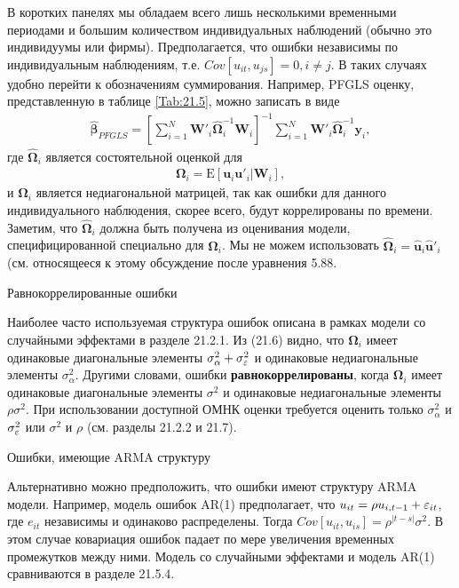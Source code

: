 В коротких панелях мы обладаем всего лишь несколькими временными периодами и большим количеством индивидуальных наблюдений (обычно это индивидуумы или фирмы). Предполагается, что ошибки независимы по индивидуальным наблюдениям, т.е. $Cov[u_{it}, u_{js}]=0, i \neq j$. В таких случаях удобно перейти к обозначениям суммирования. Например, PFGLS оценку, представленную в таблице \ref{Tab:21.5}, можно записать в виде
\begin{align}
\hat{\bm\beta}_{PFGLS}=\left[\sum^N_{i=1} \mathbf W'_i \hat{\bm\Omega}^{-1}_i \mathbf W_i \right]^{-1} \sum^N_{i=1} \mathbf W'_i \hat{\bm\Omega}^{-1}_i \mathbf y_i,
\label{Eq:21.20}
\end{align}
где $\hat{\bm\Omega}_i$ является состоятельной оценкой для 
\begin{align}
\bm\Omega_i =\mathrm E[\mathbf u_i \mathbf u'_i | \mathbf W_i],
\label{Eq:21.21}
\end{align}
и $\bm\Omega_i$ является недиагональной матрицей, так как ошибки для данного индивидуального наблюдения, скорее всего, будут коррелированы по времени. Заметим, что $\hat{\bm\Omega}_i$ должна быть получена из оценивания модели, специфицированной специально для $\bm\Omega_i$. Мы не можем использовать $\hat{\bm\Omega}_i=\hat{\mathbf u}_i\hat{\mathbf u}'_i$ (см. относящееся к этому обсуждение после уравнения 5.88. %

{\centering
Равнокоррелированные ошибки\\}

Наиболее часто используемая структура ошибок описана в рамках модели со случайными эффектами в разделе 21.2.1. Из (21.6) видно, что $\bm\Omega_i$ имеет одинаковые диагональные элементы $\sigma^2_{\alpha}+\sigma^2_{\varepsilon}$ и одинаковые недиагональные элементы $\sigma^2_{\alpha}$. Другими словами, ошибки \textbf{равнокоррелированы}, когда $\bm\Omega_i$ имеет одинаковые диагональные элементы $\sigma^2$ и одинаковые недиагональные элементы $\rho\sigma^2$. При использовании доступной ОМНК оценки требуется оценить только $\sigma^2_{\alpha}$ и $\sigma^2_{\varepsilon}$ или $\sigma^2$ и $\rho$ (см. разделы 21.2.2 и 21.7).

{\centering
Ошибки, имеющие ARMA структуру\\}

Альтернативно можно предположить, что ошибки имеют структуру ARMA модели. Например, модель ошибок AR(1) предполагает, что $u_{it}=\rho u_{i,t-1}+\varepsilon_{it}$, где $e_{it}$ независимы и одинаково распределены. Тогда  $Cov[u_{it}, u_{is}]=\rho^{|t-s|}\sigma^2$. В этом случае ковариация ошибок падает по мере увеличения временных промежутков между ними. Модель со случайными эффектами и модель AR(1) сравниваются в разделе 21.5.4.

